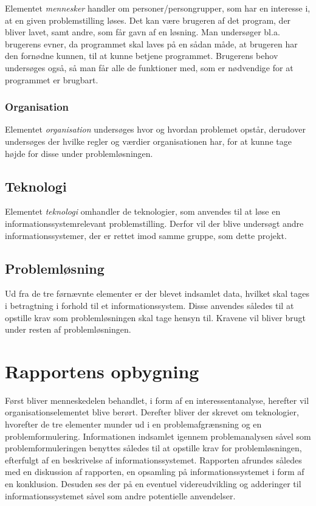 Elementet \textit{mennesker} handler om personer/persongrupper, som har en interesse i, at en given problemstilling løses. 
Det kan være brugeren af det program, der bliver lavet, samt andre, som får gavn af en løsning.
Man undersøger bl.a. brugerens evner, da programmet skal laves på en sådan måde, at brugeren har den fornødne kunnen, til at kunne betjene programmet.
Brugerens behov undersøges også, så man får alle de funktioner med, som er nødvendige for at programmet er brugbart.


\subsubsection{Organisation}\label{subsec:organisation}

Elementet \textit{organisation} undersøges hvor og hvordan problemet opstår, derudover undersøges der hvilke regler og værdier organisationen har, for at kunne tage højde for disse under problemløsningen. 


\subsection{Teknologi}\label{subsec:Teknologi}

Elementet \textit{teknologi} omhandler de teknologier, som anvendes til at løse en informationssystemrelevant problemstilling.
Derfor vil der blive undersøgt andre informationssystemer, der er rettet imod samme gruppe, som dette projekt.


\subsection{Problemløsning}
Ud fra de tre førnævnte elementer er der blevet indsamlet data, hvilket skal tages i betragtning i forhold til et informationssystem.
Disse anvendes således til at opstille krav som problemløsningen skal tage hensyn til.
Kravene vil bliver brugt under resten af problemløsningen.


\section{Rapportens opbygning}\label{sec:rapportens-opbygning}

Først bliver menneskedelen behandlet, i form af en interessentanalyse, herefter vil organisationselementet blive berørt.
Derefter bliver der skrevet om teknologier, hvorefter de tre elementer munder ud i en problemafgrænsning og en problemformulering.
Informationen indsamlet igennem problemanalysen såvel som problemformuleringen benyttes således til at opstille krav for problemløsningen, efterfulgt af en beskrivelse af informationssystemet. 
Rapporten afrundes således med en diskussion af rapporten, en opsamling på informationssystemet i form af en konklusion. Desuden ses der på en eventuel videreudvikling og adderinger til informationssystemet såvel som andre potentielle anvendelser.